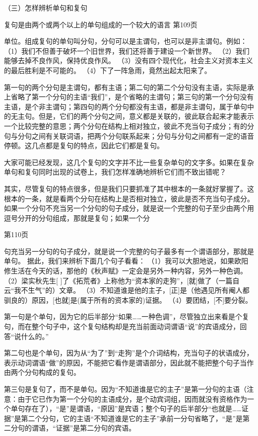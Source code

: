 （三）怎样辨析单句和复句

复句是由两个或两个以上的单句组成的一个较大的语言
第109页

单位。组成复句的单句叫分句，分句可以是主谓句，也可以是非主谓句。例如：
（1）我们不但善于破坏一个旧世界，我们还将善于建设一个新世界。
（2）我们能够去掉不良作风，保持优良作风。
（3）没有四个现代化，社会主义对资本主义的最后胜利是不可能的。
（4）下了一阵急雨，竟然出起太阳来了。

第一句的两个分句是主谓句，都有主语；第二句的第二个分句没有主语，实际是承上省略了第一个分句的主语“我们”，是个省略的主谓句；第三句的第一个分句没有主语，是个非主谓句；第四句的两个分句都没有主语，都是非主谓句，属于单句中的无主句。但是，它们的两个分句之间，意义都是关联的，彼此联合起来才能表示一个比较完整的意思；两个分句在结构上相对独立，彼此不充当句子成分；有的分句与分句之间有关联词语，把两个分句联系起来；分句与分句之间都有一定的语音停顿。这几点都是复句的特点，因此它们都是复句。

大家可能已经发现，这几个复句的文字并不比一些复杂单句的文字多。如果在复杂单句和复句同时出现的试卷上，我们怎样准确地辨析它们而不致出错呢？

其实，尽管复句的特点很多，但是我们只要抓准了其中根本的一条就好掌握了。这根本的一条，就是看两个分句在结构上是否相对独立，彼此是否不充当句子成分。如果一个分句不充当另一个分句的句子成分，就是说一个完整的句子至少由两个用逗号分开的分句组成，那就是复句；如果一个分

第110页

句充当另一分句的句子成分，就是说一个完整的句子最多有一个谓语部分，那就是单句。
据此，我们来辨析下面几个句子看看：
（1）我可以大胆地说，如果欧阳修生活在今天的话，那他的《秋声赋》一定会是另外一种内容，另外一种色调。
（2）梁实秋先生[ ]了《拓荒者》上称他为“资本家的走狗”，[就]做了（一篇自云“我不生气”的）文章。
（3）不知道谁是他的主子，[正]是（他遇见所有阉人都驯良的）原因，[也就]是(属于所有的资本家的)证据。
（4）要团结，[不]要分裂。

第一句是个单句，因为它的后半部分“如果……一种色调”，尽管独立出来看是个复句，而在整个句子中，这个复句结构却是充当前面动词谓语“说”的宾语成分，回答“说什么的。”

第二句也是个单句，因为从“为了”到“走狗”是个介词结构，充当句子的状语成分，表示动词谓语“做”的原因，不能把它看作是谓语部分，因此就不能把整个句子当作由两个分句构成的复句。

第三句是复句了，而不是单句。因为“不知道谁是它的主子”是第一分句的主语（注意：由于它已作为第一个分句的主语成分，是个动宾词组，因而就没有资格作为一个单句存在了），“是”是谓语，“原因”是宾语；整个句子的后半部分“也就是……证据”是第二个分句，它的主语“不知道谁是它的主子”承前一分句省略了，“是”是第二分句的谓语，“证据”是第二分句的宾语。

